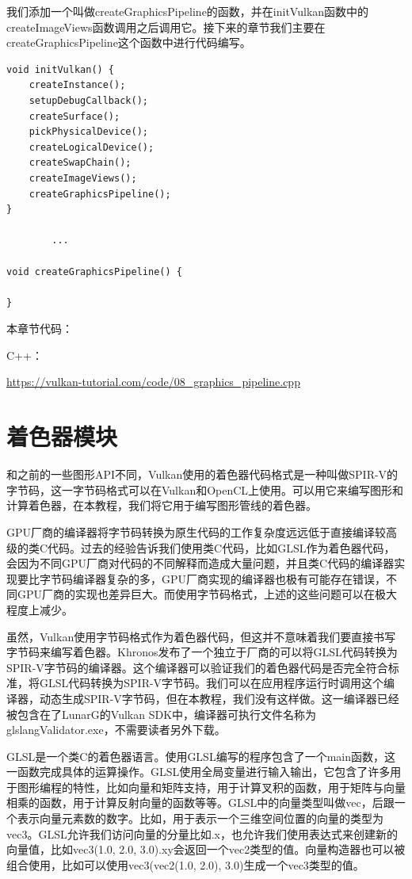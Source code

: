 \documentclass{ctexart}
\begin{document}
我们添加一个叫做createGraphicsPipeline的函数，并在initVulkan函数中的createImageViews函数调用之后调用它。接下来的章节我们主要在createGraphicsPipeline这个函数中进行代码编写。

\begin{lstlisting}[language={[ANSI]C}]
void initVulkan() {
	createInstance();
	setupDebugCallback();
	createSurface();
	pickPhysicalDevice();
	createLogicalDevice();
	createSwapChain();
	createImageViews();
	createGraphicsPipeline();
}

		...

void createGraphicsPipeline() {

}
\end{lstlisting}

本章节代码：

C++：

\url{https://vulkan-tutorial.com/code/08_graphics_pipeline.cpp}

\newpage
\section{着色器模块}

和之前的一些图形API不同，Vulkan使用的着色器代码格式是一种叫做SPIR-V的字节码，这一字节码格式可以在Vulkan和OpenCL上使用。可以用它来编写图形和计算着色器，在本教程，我们将它用于编写图形管线的着色器。

GPU厂商的编译器将字节码转换为原生代码的工作复杂度远远低于直接编译较高级的类C代码。过去的经验告诉我们使用类C代码，比如GLSL作为着色器代码，会因为不同GPU厂商对代码的不同解释而造成大量问题，并且类C代码的编译器实现要比字节码编译器复杂的多，GPU厂商实现的编译器也极有可能存在错误，不同GPU厂商的实现也差异巨大。而使用字节码格式，上述的这些问题可以在极大程度上减少。

虽然，Vulkan使用字节码格式作为着色器代码，但这并不意味着我们要直接书写字节码来编写着色器。Khronos发布了一个独立于厂商的可以将GLSL代码转换为SPIR-V字节码的编译器。这个编译器可以验证我们的着色器代码是否完全符合标准，将GLSL代码转换为SPIR-V字节码。我们可以在应用程序运行时调用这个编译器，动态生成SPIR-V字节码，但在本教程，我们没有这样做。这一编译器已经被包含在了LunarG的Vulkan SDK中，编译器可执行文件名称为glslangValidator.exe，不需要读者另外下载。

GLSL是一个类C的着色器语言。使用GLSL编写的程序包含了一个main函数，这一函数完成具体的运算操作。GLSL使用全局变量进行输入输出，它包含了许多用于图形编程的特性，比如向量和矩阵支持，用于计算叉积的函数，用于矩阵与向量相乘的函数，用于计算反射向量的函数等等。GLSL中的向量类型叫做vec，后跟一个表示向量元素数的数字。比如，用于表示一个三维空间位置的向量的类型为vec3。GLSL允许我们访问向量的分量比如.x，也允许我们使用表达式来创建新的向量值，比如vec3(1.0, 2.0, 3.0).xy会返回一个vec2类型的值。向量构造器也可以被组合使用，比如可以使用vec3(vec2(1.0, 2.0), 3.0)生成一个vec3类型的值。
\end{document}
